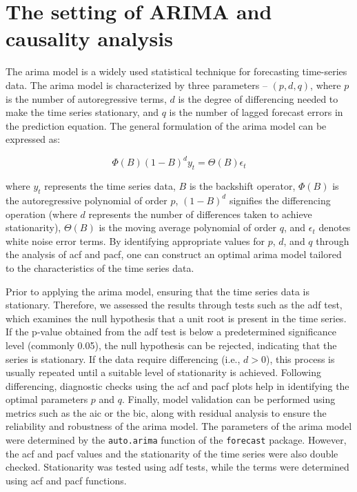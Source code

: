 \documentclass[preprint, 3p,
authoryear]{elsarticle} %
\begin{document}
\section{The setting of ARIMA and causality
analysis}\label{sec:settingarima}

The \gls{arima} model is a widely used statistical technique for
forecasting time-series data. The \gls{arima} model is characterized by
three parameters -- \((p, d, q)\), where \(p\) is the number of
autoregressive terms, \(d\) is the degree of differencing needed to make
the time series stationary, and \(q\) is the number of lagged forecast
errors in the prediction equation. The general formulation of the
\gls{arima} model can be expressed as:

\begin{equation}
\Phi(B) (1 - B)^d y_t = \Theta(B) \epsilon_t
\end{equation}

\noindent where \(y_t\) represents the time series data, \(B\) is the
backshift operator, \(\Phi(B)\) is the autoregressive polynomial of
order \(p\), \((1 - B)^d\) signifies the differencing operation (where
\(d\) represents the number of differences taken to achieve
stationarity), \(\Theta(B)\) is the moving average polynomial of order
\(q\), and \(\epsilon_t\) denotes white noise error terms. By
identifying appropriate values for \(p\), \(d\), and \(q\) through the
analysis of \gls{acf} and \gls{pacf}, one can construct an optimal
\gls{arima} model tailored to the characteristics of the time series
data.

Prior to applying the \gls{arima} model, ensuring that the time series
data is stationary. Therefore, we assessed the results through tests
such as the \gls{adf} test, which examines the null hypothesis that a
unit root is present in the time series. If the p-value obtained from
the \gls{adf} test is below a predetermined significance level (commonly
0.05), the null hypothesis can be rejected, indicating that the series
is stationary. If the data require differencing (i.e., \(d > 0\)), this
process is usually repeated until a suitable level of stationarity is
achieved. Following differencing, diagnostic checks using the \gls{acf}
and \gls{pacf} plots help in identifying the optimal parameters \(p\)
and \(q\). Finally, model validation can be performed using metrics such
as the \gls{aic} or the \gls{bic}, along with residual analysis to
ensure the reliability and robustness of the \gls{arima} model. The
parameters of the \gls{arima} model were determined by the
\texttt{auto.arima} function of the \texttt{forecast} package. However,
the \gls{acf} and \gls{pacf} values and the stationarity of the time
series were also double checked. Stationarity was tested using \gls{adf}
tests, while the terms were determined using \gls{acf} and \gls{pacf}
functions.
\end{document}
